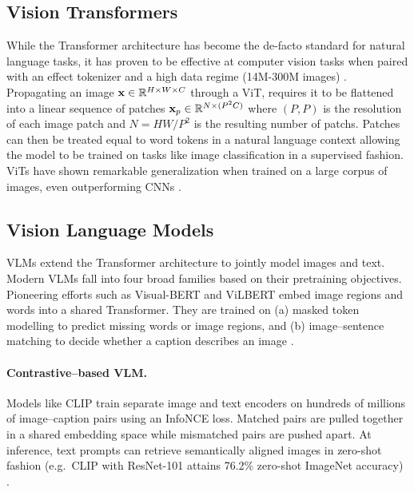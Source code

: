 
\subsection{Vision Transformers} 

While the Transformer architecture \cite{ATTENTION2023} has become the de-facto standard for natural language tasks, it has proven to be effective at computer vision tasks when paired with an effect tokenizer and a high data regime (14M-300M images) \cite{16x162021}. Propagating an image $\bold x \in \mathbb R^{H\times W\times C}$ through a \ac{ViT}, requires it to be flattened into a linear sequence of patches $\bold x_p \in \mathbb R^{N\times (P^2C)}$ where $(P,P)$ is the resolution of each image patch and $N = HW/P^2$ is the resulting number of patchs. Patches can then be treated equal to word tokens in a natural language context allowing the model to be trained on tasks like image classification in a supervised fashion. \acp{ViT} have shown remarkable generalization when trained on a large corpus of images, even outperforming \acp{CNN} \cite{16x162021}.

\subsection{Vision Language Models} 
\label{sec:vlms}

\acp{VLM} extend the Transformer architecture to jointly model images and text. Modern \acp{VLM} fall into four broad families based on their pretraining objectives. Pioneering efforts such as Visual-\ac{BERT} and ViL\ac{BERT} embed image regions and words into a shared Transformer. They are trained on (a) masked token modelling to predict missing words or image regions, and (b) image–sentence matching to decide whether a caption describes an image \cite{VISUALBERT2019,VLBERT2019}.

\paragraph{Contrastive–based VLM.}
Models like \ac{CLIP} train separate image and text encoders on hundreds of millions of image–caption pairs using an InfoNCE loss. Matched pairs are pulled together in a shared embedding space while mismatched pairs are pushed apart. At inference, text prompts can retrieve semantically aligned images in zero-shot fashion (e.g.\ \ac{CLIP} with ResNet-101 attains 76.2\% zero-shot ImageNet accuracy) \cite{CLIP2021}.

